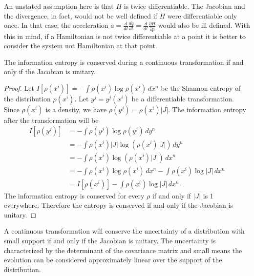 \documentclass[10pt,twocolumn, nofootinbib]{revtex4-2}
\begin{document}
\begin{remark}
	An unstated assumption here is that $H$ is twice differentiable. The Jacobian and the divergence, in fact, would not be well defined if $H$ were differentiable only once. In that case, the acceleration $a = \frac{d}{dt}\frac{dq}{dt} = \frac{d}{dt} \frac{\partial H}{\partial p}$ would also be ill defined. With this in mind, if a Hamiltonian is not twice differentiable at a point it is better to consider the system not Hamiltonian at that point.
\end{remark}

\begin{prop}
	The information entropy is conserved during a continuous transformation if and only if the Jacobian is unitary.
\end{prop}

\begin{proof}
	Let $I[\rho(x^i)] = - \int \rho(x^i) \log \rho(x^i) \, dx^n$ be the Shannon entropy of the distribution $\rho(x^i)$. Let $y^j=y^j(x^i)$ be a differentiable transformation. Since $\rho(x^i)$ is a density, we have $\rho(y^j) = \rho(x^i) |J|$. The information entropy after the transformation will be
	\begin{align*}
		I[\rho(y^j)] &= - \int \rho(y^j) \log \rho(y^j) \, dy^n \\
		&= - \int \rho(x^i) |J| \log \left( \rho(x^i) |J| \right) \, dy^n \\
		&= - \int \rho(x^i) \log \left( \rho(x^i) |J| \right) \, dx^n \\
		&= - \int \rho(x^i) \log \rho(x^i) \, dx^n - \int \rho(x^i) \log |J| \, dx^n \\
		&= I[\rho(x^i)] - \int \rho(x^i) \log |J| \, dx^n.
	\end{align*}
	The information entropy is conserved for every $\rho$ if and only if $|J|$ is 1 everywhere. Therefore the entropy is conserved if and only if the Jacobian is unitary.
\end{proof}

\begin{prop}
	A continuous transformation will conserve the uncertainty of a distribution with small support if and only if the Jacobian is unitary. The uncertainty is characterized by the determinant of the covariance matrix and small means the evolution can be considered approximately linear over the support of the distribution.
\end{prop}
\end{document}
